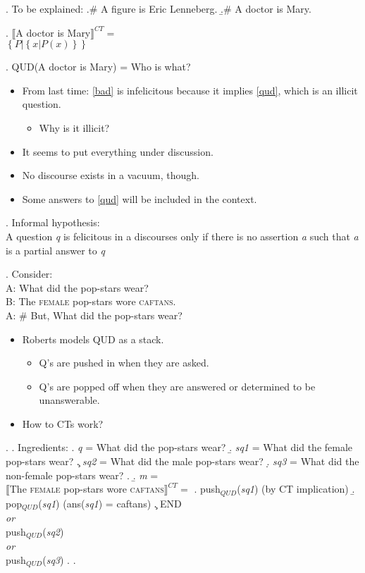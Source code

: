 \documentclass[a4paper]{article}
\begin{document}
\ex.\label{bad} To be explained:
\a.\# A figure is Eric Lenneberg.
\b.\# A doctor is Mary.

\ex.\label{ct} $\llbracket$A doctor is Mary$\rrbracket^{CT}=$\\
$\left\{ P | \left\{ x | P(x) \right\}  \right\}$

\ex.\label{qud} QUD(A doctor is Mary) = Who is what?

\begin{itemize}
	\item From last time: \ref{bad} is infelicitous because it implies \ref{qud}, which is an illicit question.
		\begin{itemize}
			\item Why is it illicit?
		\end{itemize}
	\item It seems to put everything under discussion.
	\item No discourse exists in a vacuum, though.
	\item Some answers to \ref{qud} will be included in the context.
\end{itemize}
\ex. Informal hypothesis:\\
A question \textit{q} is felicitous in a discourses only if there is no assertion \textit{a} such that \textit{a} is a partial answer to \textit{q}

\ex. Consider:\\
A: What did the pop-stars wear?\\
B: The \textsc{female} pop-stars wore \textsc{caftans}.\\
A: \# But, What did the pop-stars wear?

\begin{itemize}
	\item Roberts models QUD as a stack.
	  \begin{itemize}
	    \item Q's are pushed in when they are asked.
	    \item Q's are popped off when they are answered or determined to be unanswerable.
	  \end{itemize}
	\item How to CTs work?
\end{itemize}
\ex. 
	\a. Ingredients:
		\a. \textit{q} = What did the pop-stars wear?
		\b. \textit{sq1} = What did the female pop-stars wear?
		\c. \textit{sq2} = What did the male pop-stars wear?
		\d. \textit{sq3} = What did the non-female pop-stars wear?
		\z.
	\b. \textit{m} =\\
	$\llbracket$The \textsc{female} pop-stars wore \textsc{caftans}$\rrbracket^{CT}=$ 
		\a. push$_{QUD}$(\textit{sq1}) \hfill (by CT implication)
		\b. pop$_{QUD}$(\textit{sq1}) \hfill (ans(\textit{sq1}) = caftans)
		\c. END\\
		\textit{or}\\
		push$_{QUD}$(\textit{sq2})\\
		\textit{or}\\
		push$_{QUD}$(\textit{sq3})
		\z.
	\z.
\end{document}
